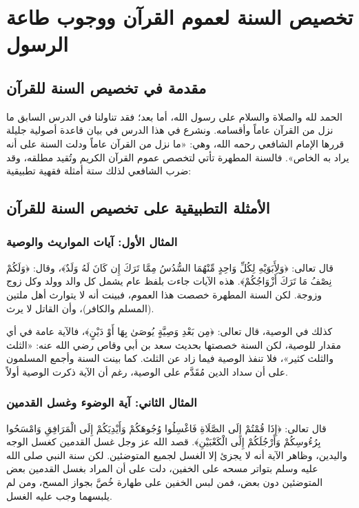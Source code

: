 \chapter{تخصيص السنة لعموم القرآن ووجوب طاعة الرسول}

\section{مقدمة في تخصيص السنة للقرآن}
الحمد لله والصلاة والسلام على رسول الله، أما بعد؛ فقد تناولنا في الدرس السابق ما نزل من القرآن عاماً وأقسامه. ونشرع في هذا الدرس في بيان قاعدة أصولية جليلة قررها الإمام الشافعي رحمه الله، وهي: «ما نزل من القرآن عاماً ودلت السنة على أنه يراد به الخاص». فالسنة المطهرة تأتي لتخصص عموم القرآن الكريم وتُقيد مطلقه، وقد ضرب الشافعي لذلك ستة أمثلة فقهية تطبيقية:

\section{الأمثلة التطبيقية على تخصيص السنة للقرآن}

\subsection{المثال الأول: آيات المواريث والوصية}
قال تعالى: ﴿وَلِأَبَوَيْهِ لِكُلِّ وَاحِدٍ مِّنْهُمَا السُّدُسُ مِمَّا تَرَكَ إِن كَانَ لَهُ وَلَدٌ﴾، وقال: ﴿وَلَكُمْ نِصْفُ مَا تَرَكَ أَزْوَاجُكُمْ﴾. هذه الآيات جاءت بلفظ عام يشمل كل والد وولد وكل زوج وزوجة. لكن السنة المطهرة خصصت هذا العموم، فبينت أنه لا يتوارث أهل ملتين (المسلم والكافر)، وأن القاتل لا يرث.

كذلك في الوصية، قال تعالى: ﴿مِن بَعْدِ وَصِيَّةٍ يُوصَىٰ بِهَا أَوْ دَيْنٍ﴾، فالآية عامة في أي مقدار للوصية، لكن السنة خصصتها بحديث سعد بن أبي وقاص رضي الله عنه: «الثلث والثلث كثير»، فلا تنفذ الوصية فيما زاد عن الثلث. كما بينت السنة وأجمع المسلمون على أن سداد الدين مُقَدَّم على الوصية، رغم أن الآية ذكرت الوصية أولاً.

\subsection{المثال الثاني: آية الوضوء وغسل القدمين}
قال تعالى: ﴿إِذَا قُمْتُمْ إِلَى الصَّلَاةِ فَاغْسِلُوا وُجُوهَكُمْ وَأَيْدِيَكُمْ إِلَى الْمَرَافِقِ وَامْسَحُوا بِرُءُوسِكُمْ وَأَرْجُلَكُمْ إِلَى الْكَعْبَيْنِ﴾. قصد الله عز وجل غسل القدمين كغسل الوجه واليدين، وظاهر الآية أنه لا يجزئ إلا الغسل لجميع المتوضئين. لكن سنة النبي صلى الله عليه وسلم بتواتر مسحه على الخفين، دلت على أن المراد بغسل القدمين بعض المتوضئين دون بعض، فمن لبس الخفين على طهارة خُصَّ بجواز المسح، ومن لم يلبسهما وجب عليه الغسل.

